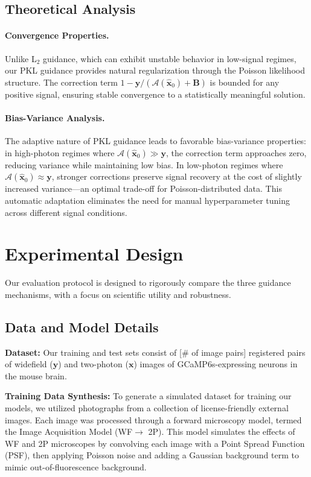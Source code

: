 \documentclass{article}
\newcommand{\wf}{WF\xspace}
\newcommand{\twop}{2P\xspace}
\begin{document}
\subsection{Theoretical Analysis}

\paragraph{Convergence Properties.} Unlike L$_2$ guidance, which can exhibit unstable behavior in low-signal regimes, our PKL guidance provides natural regularization through the Poisson likelihood structure. The correction term $1 - \mathbf{y}/(\mathcal{A}(\mathbf{\hat{x}}_0) + \mathbf{B})$ is bounded for any positive signal, ensuring stable convergence to a statistically meaningful solution.

\paragraph{Bias-Variance Analysis.} The adaptive nature of PKL guidance leads to favorable bias-variance properties: in high-photon regimes where $\mathcal{A}(\mathbf{\hat{x}}_0) \gg \mathbf{y}$, the correction term approaches zero, reducing variance while maintaining low bias. In low-photon regimes where $\mathcal{A}(\mathbf{\hat{x}}_0) \approx \mathbf{y}$, stronger corrections preserve signal recovery at the cost of slightly increased variance—an optimal trade-off for Poisson-distributed data. This automatic adaptation eliminates the need for manual hyperparameter tuning across different signal conditions.

\section{Experimental Design}
\label{sec:experiments}
Our evaluation protocol is designed to rigorously compare the three guidance mechanisms, with a focus on scientific utility and robustness.

\subsection{Data and Model Details}
\textbf{Dataset:} Our training and test sets consist of [{\# of image pairs}] registered pairs of widefield ($\mathbf{y}$) and two-photon ($\mathbf{x}$) images of GCaMP6s-expressing neurons in the mouse brain.

\textbf{Training Data Synthesis:} To generate a simulated dataset for training our models, we utilized photographs from a collection of license-friendly external images. Each image was processed through a forward microscopy model, termed the Image Acquisition Model (\wf $\rightarrow$ \twop). This model simulates the effects of \wf and \twop microscopes by convolving each image with a Point Spread Function (PSF), then applying Poisson noise and adding a Gaussian background term to mimic out-of-fluorescence background.
\end{document}
